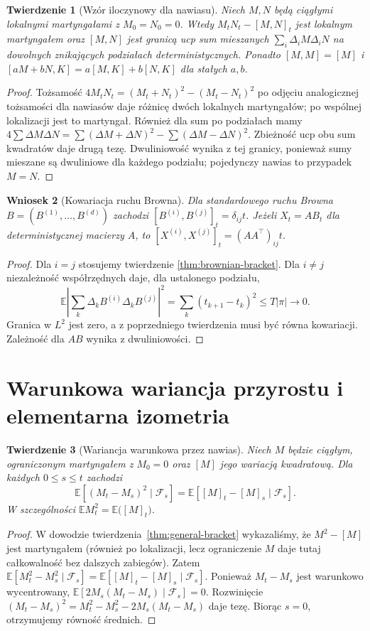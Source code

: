 \documentclass[11pt,a4paper,oneside]{report}
\numberwithin{equation}{chapter}
\theoremstyle{plain}
\newtheorem{twierdzenie}{Twierdzenie}[chapter]
\newtheorem{wniosek}[twierdzenie]{Wniosek}
\theoremstyle{definition}
\theoremstyle{remark}
\newcommand{\E}{\mathbb{E}}
\newcommand{\calF}{\mathcal{F}}
\begin{document}
\begin{twierdzenie}[Wzór iloczynowy dla nawiasu]
Niech $M,N$ będą ciągłymi lokalnymi martyngałami
z $M_0=N_0=0$. Wtedy
$M_tN_t-[M,N]_t$ jest lokalnym martyngałem oraz
$[M,N]$ jest granicą ucp sum mieszanych
$\sum_i\Delta_iM\Delta_iN$ na dowolnych
znikających podziałach deterministycznych.
Ponadto $[M,M]=[M]$ i
$[aM+bN,K]=a[M,K]+b[N,K]$ dla stałych $a,b$.
\end{twierdzenie}
\begin{proof}
Tożsamość
$4M_tN_t=(M_t+N_t)^2-(M_t-N_t)^2$
po odjęciu analogicznej tożsamości dla nawiasów
daje różnicę dwóch lokalnych martyngałów;
po wspólnej lokalizacji jest to martyngał.
Również dla sum po podziałach mamy
$4\sum\Delta M\Delta N=
\sum(\Delta M+\Delta N)^2-
\sum(\Delta M-\Delta N)^2$.
Zbieżność ucp obu sum kwadratów daje drugą tezę.
Dwuliniowość wynika z tej granicy, ponieważ
sumy mieszane są dwuliniowe dla każdego podziału;
pojedynczy nawias to przypadek $M=N$.
\end{proof}

\begin{wniosek}[Kowariacja ruchu Browna]
Dla standardowego ruchu Browna
$B=(B^{(1)},\ldots,B^{(d)})$ zachodzi
$[B^{(i)},B^{(j)}]_t=\delta_{ij}t$.
Jeżeli $X_t=AB_t$ dla deterministycznej macierzy $A$,
to $[X^{(i)},X^{(j)}]_t=(AA^\top)_{ij}t$.
\end{wniosek}
\begin{proof}
Dla $i=j$ stosujemy twierdzenie
\ref{thm:brownian-bracket}. Dla $i\ne j$ niezależność
współrzędnych daje, dla ustalonego podziału,
\[
\E\left|\sum_k\Delta_kB^{(i)}\Delta_kB^{(j)}\right|^2
=\sum_k (t_{k+1}-t_k)^2\le T|\pi|\to0.
\]
Granica w $L^2$ jest zero, a z poprzedniego
twierdzenia musi być równa kowariacji. Zależność
dla $AB$ wynika z dwuliniowości.
\end{proof}


\section{Warunkowa wariancja przyrostu i elementarna izometria}
\begin{twierdzenie}[Wariancja warunkowa przez nawias]
Niech $M$ będzie ciągłym, ograniczonym martyngałem
z $M_0=0$ oraz $[M]$ jego wariacją kwadratową.
Dla każdych $0\le s\le t$ zachodzi
\[
\E[(M_t-M_s)^2\mid\calF_s]
=\E[[M]_t-[M]_s\mid\calF_s].
\]
W szczególności $\E M_t^2=\E\bigl([M]_t\bigr)$.
\end{twierdzenie}
\begin{proof}
W dowodzie twierdzenia~\ref{thm:general-bracket}
wykazaliśmy, że $M^2-[M]$ jest martyngałem
(również po lokalizacji, lecz ograniczenie $M$ daje
tutaj całkowalność bez dalszych zabiegów).
Zatem
$\E[M_t^2-M_s^2\mid\calF_s]
=\E[[M]_t-[M]_s\mid\calF_s]$.
Ponieważ $M_t-M_s$ jest warunkowo wycentrowany,
$\E[2M_s(M_t-M_s)\mid\calF_s]=0$.
Rozwinięcie $(M_t-M_s)^2=M_t^2-M_s^2-2M_s(M_t-M_s)$
daje tezę. Biorąc $s=0$, otrzymujemy równość średnich.
\end{proof}
\end{document}

